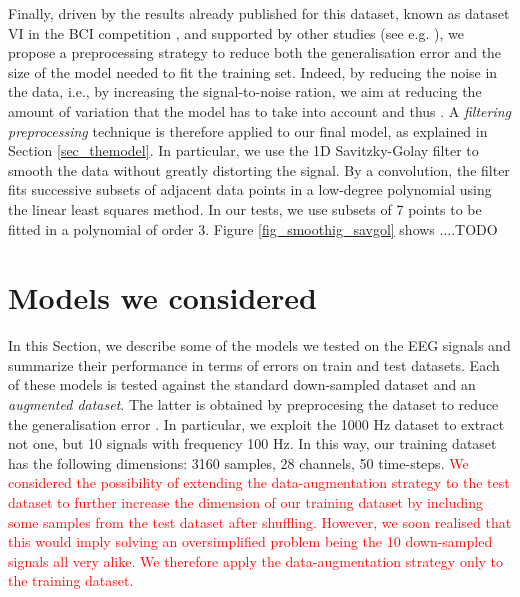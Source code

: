 \documentclass{article}
\begin{document}
Finally, driven by the results already published for this dataset, known as dataset VI in the BCI competition \cite{bci_ii}, and supported by other studies (see e.g. \cite{schirrmeister2017deep}), we propose a preprocessing strategy to reduce both the generalisation error and the size of the model needed to fit the training set.
Indeed, by reducing the noise in the data, i.e., by increasing the signal-to-noise ration, we aim at reducing the amount of variation that the model has to take into account \cite{goodfellow2016deep} and thus . 
A \emph{filtering preprocessing} technique is therefore applied to our  final model, as explained in Section \ref{sec_themodel}.
In particular, we use the 1D Savitzky-Golay filter \cite{savgol} to smooth the data without greatly distorting the signal. 
By a convolution, the filter fits successive subsets of adjacent data points in a low-degree polynomial using the linear least squares method. 
In our tests, we use subsets of 7 points to be fitted in a polynomial of order 3.
Figure \ref{fig_smoothig_savgol} shows ....TODO

 

 
 \section{Models we considered}\label{sec_allmodel}
 In this Section, we describe some of the models we tested on the EEG signals and summarize their performance in terms of errors on train and test datasets. Each of these models is tested against the standard down-sampled dataset and an \emph{augmented dataset}. The latter is obtained by preprocesing the dataset to reduce the generalisation error \cite{goodfellow2016deep}. In particular, we exploit the 1000 Hz dataset to extract not one, but 10  signals with frequency 100 Hz. 
In this way, our training dataset has the following dimensions: 3160 samples, 28 channels, 50 time-steps. 
\textcolor{red}{We considered the possibility of extending the data-augmentation strategy to the test dataset to further increase the dimension of our training dataset by including some samples from the test dataset after shuffling. 
However, we soon realised that this would imply solving an oversimplified problem being the 10 down-sampled signals all very alike. 
We therefore apply the data-augmentation strategy only to the training dataset.}
 
\end{document}
